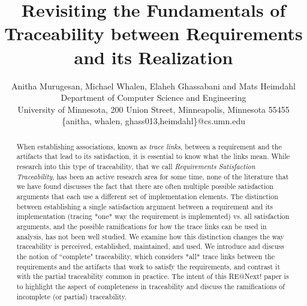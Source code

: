 \documentclass{IEEEtran}
\begin{document}
    \newcommand{\mike}[1]{\textcolor{green}{\emph {Mike: #1}}}
    \newcommand{\mats}[1]{\textcolor{blue}{\sc Mats: #1}}
    \newcommand{\sanjai}[1]{\textcolor{magenta}{\sc Sanjai: #1}}
    \newcommand{\anitha}[1]{\textcolor{red}{\emph {Anitha: #1}}}
    \newcommand{\req}[1]{\textcolor{blue}{\begin{quotation}\emph{#1}\end{quotation}}} %
    \newcommand{\eq}[1]{\textcolor{blue}{\begin{equation} #1\end{equation}}}
    \sloppypar


\title{Revisiting the Fundamentals of Traceability between Requirements and its Realization}

\author{Anitha Murugesan, Michael Whalen, Elaheh Ghassabani and Mats Heimdahl \\
      {Department of Computer Science and Engineering}\\
      {University of Minnesota, 200 Union Street, Minneapolis, Minnesota 55455}\\
      {\{anitha, whalen, ghass013,heimdahl\}@cs.umn.edu}
}

    \maketitle

    \begin{abstract}
When establishing associations, known as \emph{ trace links}, between a requirement
and the artifacts that lead to its satisfaction, it is essential to know what the links mean.  
While research into this type of
traceability, that we call \emph{Requirements Satisfaction Traceability},
 has been an active research area for some time, none of the
literature that we have found discusses the fact that there are often multiple possible 
satisfaction arguments that each use a different set of implementation elements.
The distinction between establishing a single satisfaction argument 
between a requirement and its implementation (tracing *one* way the requirement is implemented) vs. all satisfaction arguments, and the possible ramifications for how the trace
links can be used in analysis, has not been well studied.  We examine how this distinction 
changes the way traceability is perceived, established, maintained, and used.  We introduce
and discuss the notion of ``complete" traceability, which considers *all* trace
links between the requirements and the artifacts that work to satisfy the
requirements, and contrast it with the partial traceability common in
practice.  The intent of this RE@Next! paper is to highlight the aspect of
completeness in traceability and discuss the ramifications of incomplete (or
partial) traceability.
%    
    \end{abstract}

    
    
    
    
%    
%    
    

%    
%    

%



\end{document}

